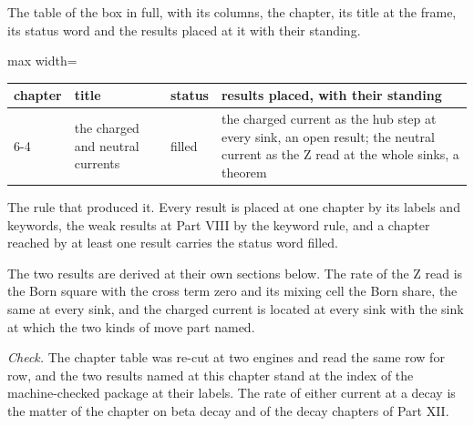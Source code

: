 \begin{chproof}[instrument]
The table of the box in full, with its columns, the chapter, its title at the frame, its status word and the results placed at it with their standing.
\begin{center}\small
\begin{adjustbox}{max width=\linewidth}\begin{tabular}{llll}
\hline
chapter & title & status & results placed, with their standing \\
\hline
6-4 & the charged and neutral currents & filled & the charged current as the hub step at every sink, an open result; the neutral current as the Z read at the whole sinks, a theorem \\
\hline
\end{tabular}\end{adjustbox}
\end{center}
The rule that produced it. Every result is placed at one chapter by its labels and keywords, the weak results at Part VIII by the keyword rule, and a chapter reached by at least one result carries the status word filled.

The two results are derived at their own sections below. The rate of the Z read is the Born square with the cross term zero and its mixing cell the Born share, the same at every sink, and the charged current is located at every sink with the sink at which the two kinds of move part named.

\emph{Check.} The chapter table was re-cut at two engines and read the same row for row, and the two results named at this chapter stand at the index of the machine-checked package at their labels.
The rate of either current at a decay is the matter of the chapter on beta decay and of the decay chapters of Part XII.
\end{chproof}
\label{chend:VI-4-charged-and-neutral-currents}

